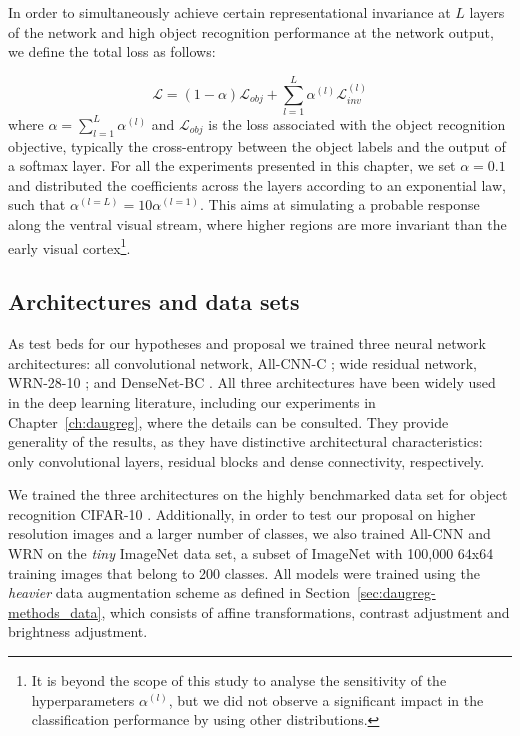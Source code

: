 {In order to simultaneously achieve certain representational invariance at $L$ layers of the network and high object recognition performance at the network output, we define the total loss as follows:

\begin{equation}
 \mathcal{L} = (1 - \alpha)\mathcal{L}_{obj} + \sum_{l=1}^{L}\alpha^{(l)}\mathcal{L}_{inv}^{(l)}
\end{equation}
%
where $\alpha = \sum_{l=1}^{L}\alpha^{(l)}$ and $\mathcal{L}_{obj}$ is the loss associated with the object recognition objective, typically the cross-entropy between the object labels and the output of a softmax layer. For all the experiments presented in this chapter, we set $\alpha=0.1$ and distributed the coefficients across the layers according to an exponential law, such that $\alpha^{(l=L)}= 10\alpha^{(l=1)}$. This aims at simulating a probable response along the ventral visual stream, where higher regions are more invariant than the early visual cortex\footnote{It is beyond the scope of this study to analyse the sensitivity of the hyperparameters $\alpha^{(l)}$, but we did not observe a significant impact in the classification performance by using other distributions.}.

\subsection{Architectures and data sets}
\label{sec:invariance-arch-and-data}
As test beds for our hypotheses and proposal we trained three neural network architectures: all convolutional network, All-CNN-C \citep{springenberg2014allcnn}; wide residual network, WRN-28-10 \citep{zagoruyko2016wrn}; and DenseNet-BC \citep{huang2017densenet}. All three architectures have been widely used in the deep learning literature, including our experiments in Chapter~\ref{ch:daugreg}, where the details can be consulted. They provide generality of the results, as they have distinctive architectural characteristics: only convolutional layers, residual blocks and dense connectivity, respectively.

We trained the three architectures on the highly benchmarked data set for object recognition CIFAR-10 \citep{krizhevsky2009cifar}. Additionally, in order to test our proposal on higher resolution images and a larger number of classes, we also trained All-CNN and WRN on the \textit{tiny} ImageNet data set, a subset of ImageNet \citep{russakovsky2015imagenet} with 100,000 64x64 training images that belong to 200 classes. All models were trained using the \textit{heavier} data augmentation scheme as defined in Section~\ref{sec:daugreg-methods_data}, which consists of affine transformations, contrast adjustment and brightness adjustment.

}
